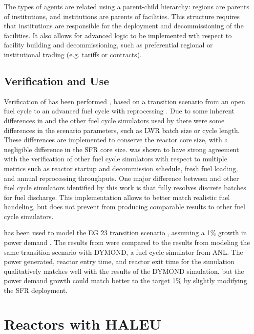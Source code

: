 The types of agents are related using a parent-child hierarchy: regions are
parents of institutions, and institutions are parents of facilities. This 
structure requires that institutions are responsible for the deployment 
and decommissioning of the facilities. It also allows for advanced logic 
to be implemented wth respect to facility building and decommissioning, 
such as preferential regional or institutional trading (e.g. tariffs or 
contracts). 

\subsection{Verification and Use}
Verification of \Cyclus has been performed \cite{bae_standardized_2019}, 
based on a transition scenario from an open fuel cycle to an advanced
fuel cycle with reprocessing \cite{feng_standardized_2016}. Due to 
some inherent differences in \Cyclus and the other fuel cycle simulators 
used by \cite{feng_standardized_2016} there were some differences in 
the scenario parameters, such as \gls{LWR} batch size or 
cycle length. These differences are implemented to conserve the reactor 
core size, with a negligible difference in the \gls{SFR} core size. \Cyclus 
was shown to have strong agreement with the verification of other 
fuel cycle simulators \cite{bae_standardized_2019} with respect to 
multiple metrics such as reactor startup and decommission schedule, fresh 
fuel loading, and annual reprocessing throughputs. One major difference
between \Cyclus and other fuel cycle simulators identified by this work 
is that \Cyclus fully resolves discrete batches for fuel discharge. This 
implementation allows \Cyclus to better match realistic fuel handeling, but 
does not prevent \Cyclus from producing comparable results to other 
fuel cycle simulators. 

\Cyclus has been used to model the EG 23 transition scenario 
\cite{wigeland_nuclear_2014}, assuming a 1\% growth in power demand 
\cite{djokic_application_2015}. The results from \Cyclus were compared 
to the results from modeling the same transition scenario with DYMOND, 
a fuel cycle simulator from \gls{ANL}. The power generated, reactor entry 
time, and reactor exit time for the \Cyclus simulation qualitatively 
matches well with the results of the DYMOND simulation, but the power 
demand growth could match better to the target 1\% by slightly modifying 
the \gls{SFR} deployment. 

\section{Reactors with HALEU}